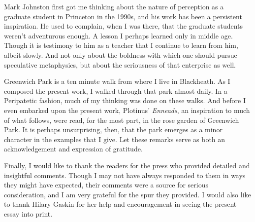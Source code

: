 Mark Johnston first got me thinking about the nature of perception as a graduate student in Princeton in the 1990s, and his work has been a persistent inspiration. He used to complain, when I was there, that the graduate students weren't adventurous enough. A lesson I perhaps learned only in middle age. Though it is testimony to him as a teacher that I continue to learn from him, albeit slowly. And not only about the boldness with which one should pursue speculative metaphysics, but about the seriousness of that enterprise as well.

Greenwich Park is a ten minute walk from where I live in Blackheath. As I composed the present work, I walked through that park almost daily. In a Peripatetic fashion, much of my thinking was done on these walks. And before I even embarked upon the present work, Plotinus' \emph{Enneads}, an inspiration to much of what follows, were read, for the most part, in the rose garden of Greenwich Park. It is perhaps unsurprising, then, that the park emerges as a minor character in the examples that I give. Let these remarks serve as both an acknowledgement and expression of gratitude.  

Finally, I would like to thank the readers for the press who provided detailed  and insightful comments. Though I may not have always responded to them in ways they might have expected, their comments were a source for serious consideration, and I am very grateful for the spur they provided. I would also like to thank Hilary Gaskin for her help and encouragement in seeing the present essay into print.

